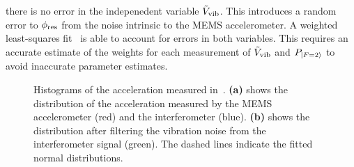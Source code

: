 there is no error in the indepenedent variable
$\tilde{V}_\textnormal{vib}$. This introduces a random
error to $\phi_\textnormal{res}$ from the noise intrinsic to the MEMS
accelerometer. A weighted least-squares fit~\cite{Macdonald1992} is
able to account for errors in both variables. This requires an
accurate estimate of the weights for each measurement of
$\tilde{V}_\textnormal{vib}$ and $P_{\ket{F=2}}$ to avoid inaccurate
parameter estimates.
\begin{figure}[htpb!]
  \centering
  \caption[Histogram of acceleration noise.]{Histograms of the
    acceleration measured in~. \textbf{(a)} shows
    the distribution of the acceleration measured by the MEMS
    accelerometer (red) and the interferometer (blue). \textbf{(b)} shows
    the distribution after filtering the vibration noise from the
    interferometer signal (green). The dashed lines indicate the
  fitted normal distributions.}
  \label{fig:vibration_hists}
\end{figure}

